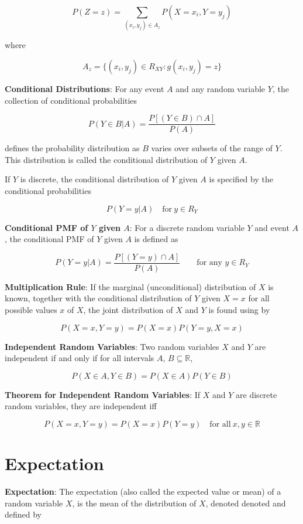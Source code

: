 \documentclass{article}
\begin{document}
\[P(Z=z)=\underset{(x_i,y_j)\in A_z}{\sum}P(X=x_i, Y=y_j)\]

where 

\[A_z=\{(x_i,y_j)\in R_{XY}:g(x_i,y_j)=z\}\]

\noindent\textbf{\color{blue}Conditional Distributions}: For any event $A$ and any random variable $Y$, the collection of conditional probabilities

\[P(Y\in B|A)=\frac{P[(Y\in B)\cap A]}{P(A)}\]

defines the probability distribution as $B$ varies over subsets of the range of $Y$. This distribution is called the conditional distribution of $Y$ given $A$. 

If $Y$ is discrete, the conditional distribution of $Y$ given $A$ is specified by the conditional probabilities

\[P(Y=y|A)\quad\text{for}\ y\in R_Y\]

\noindent\textbf{\color{blue}Conditional PMF of $Y$ given $A$}: For a discrete random variable $Y$ and event $A$, the conditional PMF of $Y$ given $A$ is defined as 

\[P(Y=y|A)=\frac{P[(Y=y)\cap A]}{P(A)}\qquad\text{for any }y\in R_Y\]

\noindent\textbf{\color{red}Multiplication Rule}: If the marginal (unconditional) distribution of $X$ is known, together with the conditional distribution of $Y$ given $X=x$ for all possible values $x$ of $X$, the joint distribution of $X$ and $Y$ is found using by

\[P(X=x,Y=y)=P(X=x)P(Y=y,X=x)\]

\noindent\textbf{\color{blue}Independent Random Variables}: Two random variables $X$ and $Y$ are independent if and only if for all intervals $A$, $B\subseteq\mathbb{R}$,

\[P(X\in A,Y\in B)=P(X\in A)P(Y\in B)\]

\noindent\textbf{\color{red}Theorem for Independent Random Variables}: If $X$ and $Y$ are discrete random variables, they are independent iff 

\[P(X=x,Y=y)=P(X=x)P(Y=y)\quad\text{for all}\ x,y\in\mathbb{R}\]

\section{Expectation}

\textbf{\color{blue}Expectation}: The expectation (also called the expected value or mean) of a random variable $X$, is the mean of the distribution of $X$, denoted denoted and defined by
\end{document}
